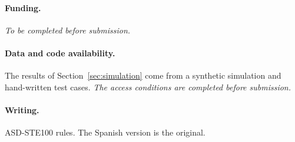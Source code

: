 \documentclass[11pt,a4paper]{article}
\begin{document}
\paragraph{Funding.} \textit{To be completed before submission.}

\paragraph{Data and code availability.} The results of Section~\ref{sec:simulation} come from a synthetic
simulation and hand-written test cases. \textit{The access conditions are completed before submission.}

\paragraph{Writing.} ASD-STE100 rules. The Spanish version is the original.



\end{document}

